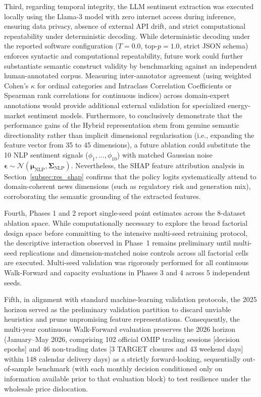 Third, regarding temporal integrity, the LLM sentiment extraction was executed locally using the Llama-3 model with zero internet access during inference, ensuring data privacy, absence of external API drift, and strict computational repeatability under deterministic decoding. While deterministic decoding under the reported software configuration ($T=0.0$, top-$p=1.0$, strict JSON schema) enforces syntactic and computational repeatability, future work could further substantiate semantic construct validity by benchmarking against an independent human-annotated corpus. Measuring inter-annotator agreement (using weighted Cohen's $\kappa$ for ordinal categories and Intraclass Correlation Coefficients or Spearman rank correlations for continuous indices) across domain-expert annotations would provide additional external validation for specialized energy-market sentiment models. Furthermore, to conclusively demonstrate that the performance gains of the Hybrid representation stem from genuine semantic directionality rather than implicit dimensional regularisation (i.e., expanding the feature vector from 35 to 45 dimensions), a future ablation could substitute the 10 NLP sentiment signals ($\phi_1, \dots, \phi_{10}$) with matched Gaussian noise $\boldsymbol{\epsilon} \sim \mathcal{N}(\boldsymbol{\mu}_{\text{NLP}}, \boldsymbol{\Sigma}_{\text{NLP}})$. Nevertheless, the SHAP feature attribution analysis in Section~\ref{subsec:res_shap} confirms that the policy logits systematically attend to domain-coherent news dimensions (such as regulatory risk and generation mix), corroborating the semantic grounding of the extracted features.

Fourth, Phases 1 and 2 report single-seed point estimates across the 8-dataset ablation space. While computationally necessary to explore the broad factorial design space before committing to the intensive multi-seed retraining protocol, the descriptive interaction observed in Phase~1 remains preliminary until multi-seed replications and dimension-matched noise controls across all factorial cells are executed. Multi-seed validation was rigorously performed for all continuous Walk-Forward and capacity evaluations in Phases 3 and 4 across 5 independent seeds.

Fifth, in alignment with standard machine-learning validation protocols, the 2025 horizon served as the preliminary validation partition to discard unviable heuristics and prune unpromising feature representations. Consequently, the multi-year continuous Walk-Forward evaluation preserves the 2026 horizon (January--May 2026, comprising 102 official OMIP trading sessions [decision epochs] and 46 non-trading dates [3 TARGET closures and 43 weekend days] within 148 calendar delivery days) as a strictly forward-looking, sequentially out-of-sample benchmark (with each monthly decision conditioned only on information available prior to that evaluation block) to test resilience under the wholesale price dislocation.

